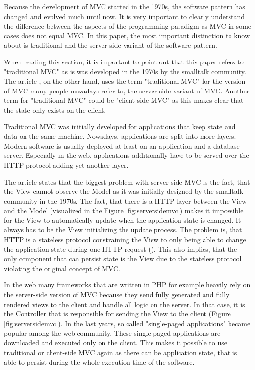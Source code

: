 Because the development of MVC started in the 1970s, the software pattern has changed and evolved much until now. It is very important to clearly understand the difference between the aspects of the programming paradigm as MVC in some cases does not equal MVC. In this paper, the most important distinction to know about is traditional and the server-side variant of the software pattern.

When reading this section, it is important to point out that this paper refers to "traditional MVC" as is was developed in the 1970s by the smalltalk community. The article \cite{ChristianAlfoni.2015}, on the other hand, uses the term "traditional MVC" for the version of MVC many people nowadays refer to, the server-side variant of MVC. Another term for "traditional MVC" could be "client-side MVC" as this makes clear that the state only exists on the client.

Traditional MVC was initially developed for applications that keep state and data on the same machine. Nowadays, applications are split into more layers. Modern software is usually deployed at least on an application and a database server. Especially in the web, applications additionally have to be served over the HTTP-protocol adding yet another layer.
 
The article \cite{ChristianAlfoni.2015} states that the biggest problem with server-side MVC is the fact, that the View cannot observe the Model as it was initially designed by the smalltalk community in the 1970s. The fact, that there is a HTTP layer between the View and the Model (visualized in the Figure \ref{fig:serversidemvc}) makes it impossible for the View to automatically update when the application state is changed. It always has to be the View initializing the update process. The problem is, that HTTP is a stateless protocol constraining the View to only being able to change the application state during one HTTP-request (\cite{PaulCowan.2013}). This also implies, that the only component that can persist state is the View due to the stateless protocol violating the original concept of MVC.

In the web many frameworks that are written in PHP for example heavily rely on the server-side version of MVC because they send fully generated and fully rendered views to the client and handle all logic on the server. In that case, it is the Controller that is responsible for sending the View to the client (Figure \ref{fig:serversidemvc}). In the last years, so called "single-paged applications" became popular among the web community. These single-paged applications are downloaded and executed only on the client. This makes it possible to use traditional or client-side MVC again as there can be application state, that is able to persist during the whole execution time of the software.

